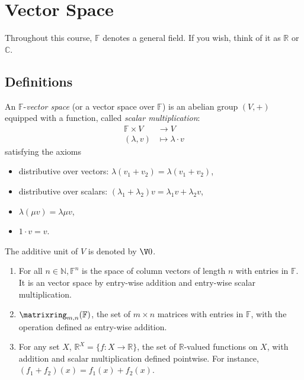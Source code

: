\documentclass[a4paper]{article}
\newcommand*{\M}{\matrixring}
\theoremstyle{definition}
\begin{document}


\tableofcontents

\section{Vector Space}

\begin{convention}
  Throughout this course, $\mathbb{F}$ denotes a general field. If you wish, think of it as $\mathbb{R}$ or $\mathbb{C}$.
\end{convention}

\subsection{Definitions}

\begin{definition}
  An $\mathbb{F}$-\emph{vector space} (or a vector space over $\mathbb{F}$) is an abelian group $(V, +)$ equipped with a function, called \emph{scalar multiplication}:
  \begin{align*}
    \mathbb{F}\times V &\to V \\
    (\lambda, v) &\mapsto \lambda\cdot v
  \end{align*}
  satisfying the axioms
  \begin{itemize}
  \item distributive over vectors: $\lambda(v_1+v_2) = \lambda(v_1+v_2)$,
  \item distributive over scalars: $(\lambda_1+\lambda_2)v= \lambda_1 v+\lambda_2 v$,
  \item $\lambda(\mu v) = \lambda \mu v$,
  \item $1\cdot v = v$.
  \end{itemize}
\end{definition}

The additive unit of $V$ is denoted by $\V 0$.

\begin{eg}\leavevmode
  \label{eg:matrix as V}
  \begin{enumerate}
  \item For all $n \in \mathbb{N}, \mathbb{F}^n$ is the space of column vectors of length $n$ with entries in $\mathbb{F}$. It is an vector space by entry-wise addition and entry-wise scalar multiplication.
  \item $\M_{m,n}(\mathbb{F})$, the set of $m\times n$ matrices with entries in $\mathbb{F}$, with the operation defined as entry-wise addition.
  \item For any set $X$, $\mathbb{R}^X = \{f: X \to \mathbb{R}\}$, the set of $\mathbb{R}$-valued functions on $X$, with addition and scalar multiplication defined pointwise. For instance, $(f_1+f_2)(x) = f_1(x)+f_2(x)$.
  \end{enumerate}
\end{eg}
\end{document}

